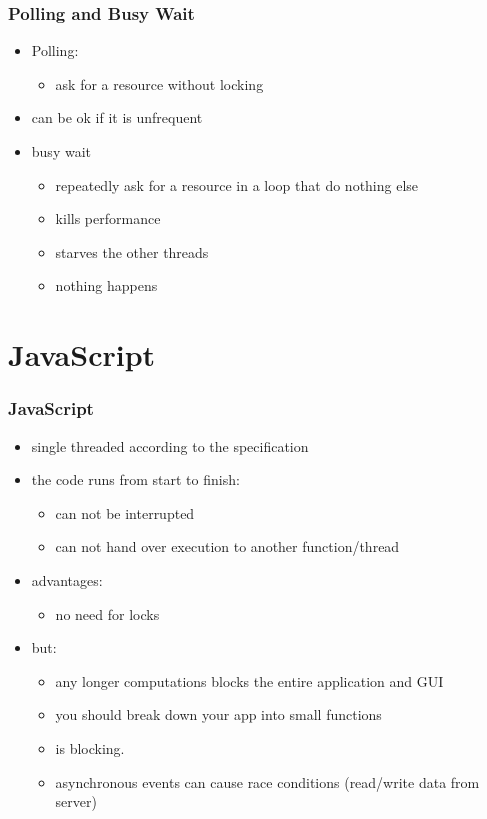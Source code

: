 \begin{frame}[fragile] \frametitle{Polling and Busy Wait}
\begin{itemize}
  \item Polling:
  \begin{itemize}
    \item ask for a resource without locking
  \end{itemize}
  \item can be ok if it is unfrequent
  \item busy wait
  \begin{itemize}
    \item repeatedly ask for a resource in a loop that do nothing else
    \item  kills performance
    \item starves the other threads
    \item nothing happens
  \end{itemize}
\end{itemize}
\end{frame}

\section{JavaScript}
\begin{frame}[fragile] \frametitle{JavaScript}
\begin{itemize}
  \item single threaded according to the specification
  \item the code runs from start to finish:
  \begin{itemize}
    \item can not be interrupted
    \item can not hand over execution to another function/thread
  \end{itemize}
  \item advantages:
  \begin{itemize}
    \item no need for locks
  \end{itemize}
  \item but:
  \begin{itemize}
    \item any longer computations blocks the entire application and GUI
    \item you should break down your app into small functions
    \item {} is blocking.
    \item asynchronous events can cause race conditions (read/write data from server)
  \end{itemize}
\end{itemize}
\vspace{5mm}
\end{frame}

